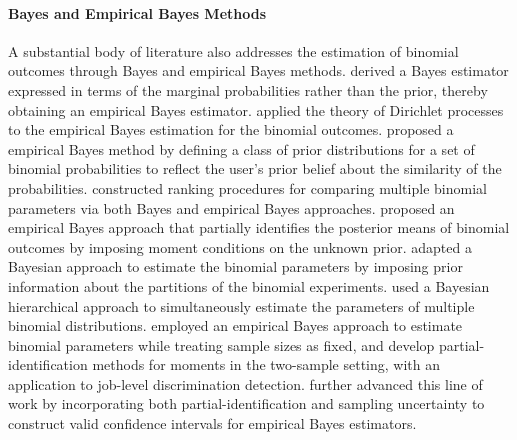 \documentclass[12pt,letterpaper]{article}
\begin{document}
\paragraph{Bayes and Empirical Bayes Methods} A substantial body of literature also addresses the estimation of binomial outcomes through Bayes and empirical Bayes methods. \citet{griffin1971empirical} derived a Bayes estimator expressed in terms of the marginal probabilities rather than the prior, thereby obtaining an empirical Bayes estimator. \citet{berry1979empirical} applied the theory of Dirichlet processes to the empirical Bayes estimation for the binomial outcomes. \citet{albert1984empirical} proposed a empirical Bayes method by defining a class of prior distributions for a set of binomial probabilities to reflect the user's prior belief about the similarity of the probabilities. \citet{sobel1993bayes} constructed ranking procedures for comparing multiple binomial parameters via both Bayes and empirical Bayes approaches. \citet{sivaganesan1993robust} proposed an empirical Bayes approach that partially identifies the posterior means of binomial outcomes by imposing moment conditions on the unknown prior. \citet{consonni1995bayesian} adapted a Bayesian approach to estimate the binomial parameters by imposing prior information about the partitions of the binomial experiments. \citet{weiss2010bayesian} used a Bayesian hierarchical approach to simultaneously estimate the parameters of multiple binomial distributions. \citet{kline2021reasonable} employed an empirical Bayes approach to estimate binomial parameters while treating sample sizes as fixed, and develop partial-identification methods for moments in the two-sample setting, with an application to job-level discrimination detection. \citet{gu2025reasonable} further advanced this line of work by incorporating both partial-identification and sampling uncertainty to construct valid confidence intervals for empirical Bayes estimators. 
\end{document}
